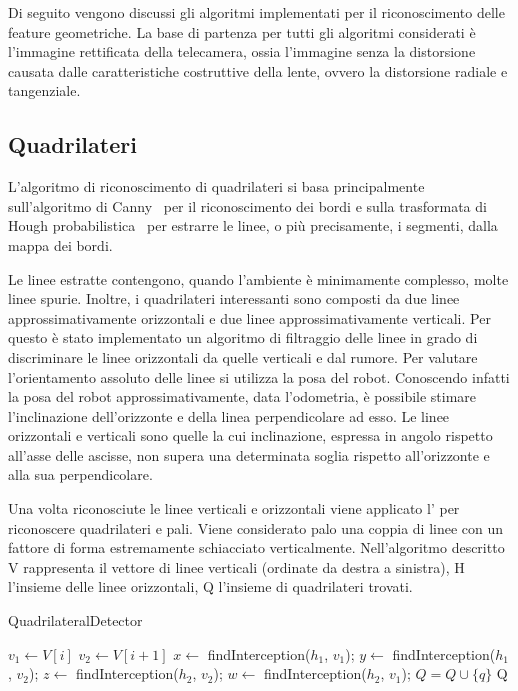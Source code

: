 Di seguito vengono discussi gli algoritmi implementati per il riconoscimento delle feature geometriche.
La base di partenza per tutti gli algoritmi considerati è l'immagine rettificata della telecamera, ossia l'immagine senza la distorsione causata dalle caratteristiche costruttive della lente, ovvero la distorsione radiale e tangenziale.

\subsection{Quadrilateri}

L'algoritmo di riconoscimento di quadrilateri si basa principalmente sull'algoritmo di Canny~\cite{4767851} per il riconoscimento dei bordi e sulla trasformata di Hough probabilistica~\cite{matas2000robust} per estrarre le linee, o più precisamente, i segmenti, dalla mappa dei bordi.

Le linee estratte contengono, quando l'ambiente è minimamente complesso, molte linee spurie. Inoltre, i quadrilateri interessanti sono composti da due linee approssimativamente orizzontali e due linee approssimativamente verticali. Per questo è stato implementato un algoritmo di filtraggio delle linee in grado di discriminare le linee orizzontali da quelle verticali e dal rumore. Per valutare l'orientamento assoluto delle linee si utilizza la posa del robot. Conoscendo infatti la posa del robot approssimativamente, data l'odometria, è possibile stimare l'inclinazione dell'orizzonte e della linea perpendicolare ad esso. Le linee orizzontali e verticali sono quelle la cui inclinazione, espressa in angolo rispetto all'asse delle ascisse, non supera una determinata soglia rispetto all'orizzonte e alla sua perpendicolare.

Una volta riconosciute le linee verticali e orizzontali viene applicato l' per riconoscere quadrilateri e pali.
Viene considerato palo una coppia di linee con un fattore di forma estremamente schiacciato verticalmente. Nell'algoritmo descritto V rappresenta il vettore di linee verticali (ordinate da destra a sinistra), H l'insieme delle linee orizzontali, Q l'insieme di quadrilateri trovati.

\begin{algorithm}[ht]
\caption{QuadrilateralDetector}
\label{alg:quad-det}
\begin{algorithmic}[1] 
  \State $v_{1} \leftarrow V[i]$
  \State $v_{2} \leftarrow V[i+1]$
      \State $x \leftarrow$ findInterception($h_{1}$, $v_{1}$);
      \State $y \leftarrow$ findInterception($h_{1}$, $v_{2}$);
      \State $z \leftarrow$ findInterception($h_{2}$, $v_{2}$);
      \State $w \leftarrow$ findInterception($h_{2}$, $v_{1}$);
	\State $Q = Q \cup \lbrace q \rbrace$
      \EndIf
    \EndFor
  \EndIf
\EndFor
\Return Q
\end{algorithmic}
\end{algorithm}

